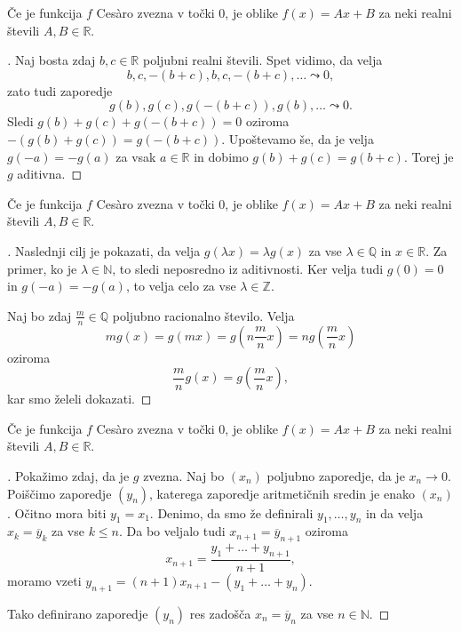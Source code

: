 \documentclass{beamer}
\newenvironment{dokaz}{\begin{proof}[\bfseries\upshape\proofname]}{\end{proof}}
\begin{document}
\begin{frame}
    \begin{block}{}
        Če je funkcija $f$ Ces\`{a}ro zvezna v točki $0$, je oblike $f(x) = Ax + B$ za neki realni števili $A, B \in \mathbb{R}$.
    \end{block}
    \begin{dokaz}\renewcommand{\qedsymbol}{}
        Naj bosta zdaj $b, c \in \mathbb{R}$ poljubni realni števili. Spet vidimo, da velja 
        $$b, c, -(b+c), b, c, -(b+c), \ldots \leadsto 0,$$ zato tudi zaporedje $$g(b), g(c), g(-(b+c)), g(b), \ldots \leadsto 0.$$
        \pause
        Sledi $g(b) + g(c) + g(-(b+c)) = 0$ oziroma $-(g(b) + g(c)) = g(-(b+c))$. 
        \pause 
        Upoštevamo še, da je velja $g(-a) = -g(a)$ za vsak $a \in \mathbb{R}$ in dobimo $g(b) + g(c) = g(b+c)$. Torej je $g$ aditivna.
    \end{dokaz}
\end{frame}

\begin{frame}
    \begin{block}{}
        Če je funkcija $f$ Ces\`{a}ro zvezna v točki $0$, je oblike $f(x) = Ax + B$ za neki realni števili $A, B \in \mathbb{R}$.
    \end{block}
    \begin{dokaz}\renewcommand{\qedsymbol}{}
        Naslednji cilj je pokazati, da velja $g(\lambda x) = \lambda g(x)$ za vse $\lambda \in \mathbb{Q}$ in $x \in \mathbb{R}$. Za primer, ko je $\lambda \in \mathbb{N}$, to sledi neposredno iz aditivnosti. Ker velja tudi $g(0) = 0$ in $g(-a) = -g(a)$, to velja celo za vse $\lambda \in \mathbb{Z}$. 
        \pause

        Naj bo zdaj $\frac{m}{n} \in \mathbb{Q}$ poljubno racionalno število. Velja 
        $$mg(x) = g(mx) = g(n\frac{m}{n}x) = ng(\frac{m}{n}x)$$ 
        oziroma 
        $$\frac{m}{n}g(x) = g(\frac{m}{n}x),$$ 
        kar smo želeli dokazati.
    \end{dokaz}
\end{frame}

\begin{frame}
    \begin{block}{}
        Če je funkcija $f$ Ces\`{a}ro zvezna v točki $0$, je oblike $f(x) = Ax + B$ za neki realni števili $A, B \in \mathbb{R}$.
    \end{block}
    \begin{dokaz}\renewcommand{\qedsymbol}{}
        Pokažimo zdaj, da je $g$ zvezna. Naj bo $(x_n)$ poljubno zaporedje, da je $x_n \rightarrow 0$. Poiščimo zaporedje $(y_n)$, katerega zaporedje aritmetičnih sredin je enako $(x_n)$. 
        \pause
        Očitno mora biti $y_1 = x_1$. Denimo, da smo že definirali $y_1, \ldots, y_n$ in da velja $x_k = \overline{y}_k$ za vse $k \leq n$. Da bo veljalo tudi $x_{n+1} = \overline{y}_{n+1}$ oziroma 
        $$x_{n+1} = \frac{y_1 + \ldots + y_{n+1}}{n+1},$$ 
        moramo vzeti $y_{n+1} = (n+1)x_{n+1} - (y_1 + \ldots + y_n)$. 
        \pause
        
        Tako definirano zaporedje $(y_n)$ res zadošča $x_n = \overline{y}_n$ za vse $n \in \mathbb{N}$.
    \end{dokaz}
\end{frame}
\end{document}
